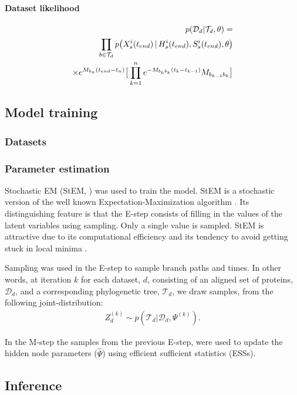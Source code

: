 \documentclass[nogrid]{MBE}%
\begin{document}
\paragraph{Dataset likelihood}
\begin{align}
p(\mathcal{D}_d|\mathcal{T}_d,\theta)=\notag\\
\prod_{b \in \mathcal{T}_d} p\big(X_{s}^{i}(t_{end})\,|\,H_{s}^{i}(t_{end}),S_{s}^{i}(t_{end}),\theta\big)\notag\\ 
\times e^{M_{b_{n}}(t_{end}-t_{n})} \big[\prod_{k=1}^{n}  e^{-M_{b_{k}b_{k}}(t_{k}-t_{k-1})} M_{b_{k-1}b_{k}} \big]
\end{align}

\subsection{Model training}

\subsubsection{Datasets}

\subsubsection{Parameter estimation}
Stochastic EM (StEM, \citet{gilks1995markov}) was used to train the model. StEM  is a stochastic version of the well known Expectation-Maximization algorithm \citep{gilks1995markov}. Its distinguishing feature is that the E-step consists of filling in the values of the latent variables using sampling. Only a single value is sampled. StEM is attractive due to its computational efficiency and its tendency to avoid getting stuck in local minima \citep{gilks1995markov}.

Sampling was used in the E-step to sample branch paths and times. In other words, at iteration $k$ for each dataset, $d$, consisting of an aligned set of proteins, $\mathcal{D}_d$,  and a corresponding phylogenetic tree, $\mathcal{T}_d$, we draw samples, from the following joint-distribution:
\begin{align*}
Z_{d}^{(k)}\sim p(\mathcal{T}_d|\mathcal{D}_d,\Psi^{(k)}).
\end{align*}

In the M-step the samples from the previous E-step, were used to update the hidden node parameters ($\hat{\Psi}$) using efficient sufficient statistics (ESSs).
\subsection{Inference}
\end{document}
